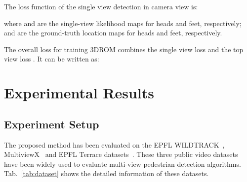 \documentclass[runningheads]{llncs}
\begin{document}
	
	The loss function of the single view detection in camera view  is:
	
	where  and  are the single-view likelihood maps for heads and feet, respectively;  and  are the ground-truth location maps for heads and feet, respectively.
	
	The overall loss for training 3DROM combines the single view loss  and the top view loss . It can be written as:
	
	
	
	
	\section{Experimental Results}
	\subsection{Experiment Setup}
	The proposed method has been evaluated on the EPFL WILDTRACK~\cite{WILDTRACK_dataset}\cite{chavdarova2018wildtrack}, MultiviewX~\cite{MultiviewX_dataset}\cite{hou2020multiview} and EPFL Terrace datasets~\cite{Terrace_dataset}. These three public video datasets have been widely used to evaluate multi-view pedestrian detection algorithms. Tab.~\ref{tab:dataset} shows the detailed information of these datasets.
\end{document}

